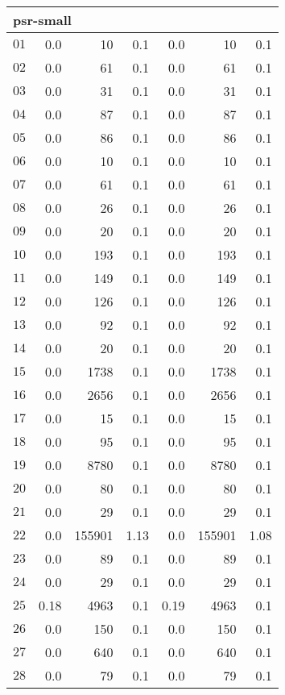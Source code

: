 \begin{longtable}{|c||r|r|r||r|r|r|}
\multicolumn{7}{|l|}{psr-small}\\\hline
$01$ & 0.0 & 10 & 0.1 &0.0 & 10 & 0.1 \\\hline
$02$ & 0.0 & 61 & 0.1 &0.0 & 61 & 0.1 \\\hline
$03$ & 0.0 & 31 & 0.1 &0.0 & 31 & 0.1 \\\hline
$04$ & 0.0 & 87 & 0.1 &0.0 & 87 & 0.1 \\\hline
$05$ & 0.0 & 86 & 0.1 &0.0 & 86 & 0.1 \\\hline
$06$ & 0.0 & 10 & 0.1 &0.0 & 10 & 0.1 \\\hline
$07$ & 0.0 & 61 & 0.1 &0.0 & 61 & 0.1 \\\hline
$08$ & 0.0 & 26 & 0.1 &0.0 & 26 & 0.1 \\\hline
$09$ & 0.0 & 20 & 0.1 &0.0 & 20 & 0.1 \\\hline
$10$ & 0.0 & 193 & 0.1 &0.0 & 193 & 0.1 \\\hline
$11$ & 0.0 & 149 & 0.1 &0.0 & 149 & 0.1 \\\hline
$12$ & 0.0 & 126 & 0.1 &0.0 & 126 & 0.1 \\\hline
$13$ & 0.0 & 92 & 0.1 &0.0 & 92 & 0.1 \\\hline
$14$ & 0.0 & 20 & 0.1 &0.0 & 20 & 0.1 \\\hline
$15$ & 0.0 & 1738 & 0.1 &0.0 & 1738 & 0.1 \\\hline
$16$ & 0.0 & 2656 & 0.1 &0.0 & 2656 & 0.1 \\\hline
$17$ & 0.0 & 15 & 0.1 &0.0 & 15 & 0.1 \\\hline
$18$ & 0.0 & 95 & 0.1 &0.0 & 95 & 0.1 \\\hline
$19$ & 0.0 & 8780 & 0.1 &0.0 & 8780 & 0.1 \\\hline
$20$ & 0.0 & 80 & 0.1 &0.0 & 80 & 0.1 \\\hline
$21$ & 0.0 & 29 & 0.1 &0.0 & 29 & 0.1 \\\hline
$22$ & 0.0 & 155901 & 1.13 &0.0 & 155901 & 1.08 \\\hline
$23$ & 0.0 & 89 & 0.1 &0.0 & 89 & 0.1 \\\hline
$24$ & 0.0 & 29 & 0.1 &0.0 & 29 & 0.1 \\\hline
$25$ & 0.18 & 4963 & 0.1 &0.19 & 4963 & 0.1 \\\hline
$26$ & 0.0 & 150 & 0.1 &0.0 & 150 & 0.1 \\\hline
$27$ & 0.0 & 640 & 0.1 &0.0 & 640 & 0.1 \\\hline
$28$ & 0.0 & 79 & 0.1 &0.0 & 79 & 0.1 \\\hline

\end{longtable}
